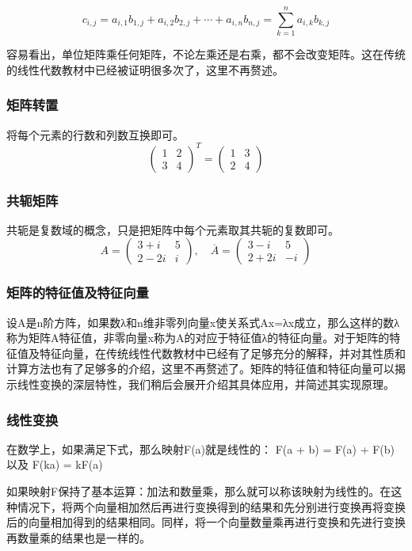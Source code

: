 $$c_{i,j}=a_{i,1} b_{1,j}+a_{i,2} b_{2,j}+\cdots+a_{i,n} b_{n,j}=\sum_{k=1}^n a_{i,k} b_{k,j}$$

容易看出，单位矩阵乘任何矩阵，不论左乘还是右乘，都不会改变矩阵。这在传统的线性代数教材中已经被证明很多次了，这里不再赘述。

\subsubsection{矩阵转置}
将每个元素的行数和列数互换即可。
$$\begin{pmatrix}1&2\\3&4\end{pmatrix}^T=\begin{pmatrix}1&3\\2&4\end{pmatrix}$$

\subsubsection{共轭矩阵}
共轭是复数域的概念，只是把矩阵中每个元素取其共轭的复数即可。
$$A=\begin{pmatrix}3+i&5\\2-2i&i\end{pmatrix}, \quad \overline{A}=\begin{pmatrix}3-i&5\\2+2i&-i\end{pmatrix}$$

\subsubsection{矩阵的特征值及特征向量}
设A是n阶方阵，如果数λ和n维非零列向量x使关系式Ax=λx成立，那么这样的数λ称为矩阵A特征值，非零向量x称为A的对应于特征值λ的特征向量。对于矩阵的特征值及特征向量，在传统线性代数教材中已经有了足够充分的解释，并对其性质和计算方法也有了足够多的介绍，这里不再赘述了。矩阵的特征值和特征向量可以揭示线性变换的深层特性，我们稍后会展开介绍其具体应用，并简述其实现原理。

\subsubsection{线性变换}
在数学上，如果满足下式，那么映射F(a)就是线性的：
F(a + b) = F(a) + F(b) 以及 F(ka) = kF(a)

如果映射F保持了基本运算：加法和数量乘，那么就可以称该映射为线性的。在这种情况下，将两个向量相加然后再进行变换得到的结果和先分别进行变换再将变换后的向量相加得到的结果相同。同样，将一个向量数量乘再进行变换和先进行变换再数量乘的结果也是一样的。

